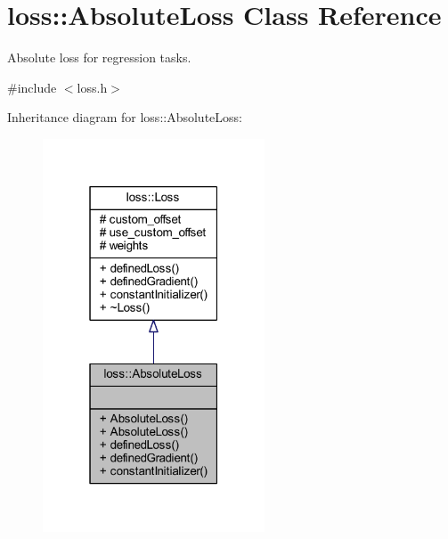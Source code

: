 \hypertarget{classloss_1_1_absolute_loss}{}\section{loss\+:\+:Absolute\+Loss Class Reference}
\label{classloss_1_1_absolute_loss}


Absolute loss for regression tasks.  




{\ttfamily \#include $<$loss.\+h$>$}



Inheritance diagram for loss\+:\+:Absolute\+Loss\+:
\nopagebreak
\begin{figure}[H]
\begin{center}
\leavevmode
\includegraphics[width=187pt]{classloss_1_1_absolute_loss__inherit__graph}
\end{center}
\end{figure}


